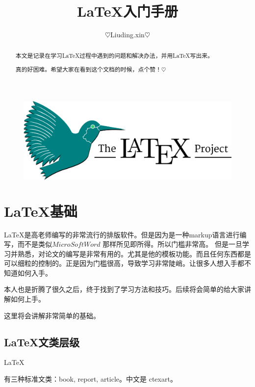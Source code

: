 \documentclass[UTF8]{ctexart}
\begin{document}
\title{\LaTeX 入门手册}
\author{$\heartsuit$Liuding.xin$\heartsuit$}


\begin{titlepage}
    \maketitle %
    \begin{figure}[htbp]
        \centering
        \includegraphics[scale=0.4,angle=-50]{images/1200px_LaTeX_project_logo_bird.svg.png}
    \end{figure}
\end{titlepage}

\tableofcontents

\listoffigures

\listoftables

\clearpage

\begin{abstract}
    本文是记录在学习\LaTeX 过程中遇到的问题和解决办法，并用\LaTeX 写出来。

    真的好困难。希望大家在看到这个文档的时候，点个赞！$\heartsuit$
\end{abstract}

\section{\LaTeX 基础}
\label{sec:knowledge}
\LaTeX 是高老师编写的非常流行的排版软件。但是因为是一种markup语言进行编写，而不是类似$MicroSoft Word$ 那样所见即所得。所以门槛非常高。
但是一旦学习并熟悉，对论文的编写是非常有用的。尤其是他的模板功能。而且任何东西都是可以细粒的控制的。正是因为门槛很高，导致学习非常陡峭。让很多人想入手都不知道如何入手。

本人也是折腾了很久之后，终于找到了学习方法和技巧。后续将会简单的给大家讲解如何上手。

这里将会讲解非常简单的基础。

\subsection{\LaTeX 文类层级}
\label{sec:structure}
\hypertarget{Levelofdepth}{\LaTeX} 有三种标准文类：book, report, article。中文是 ctexart。
\end{document}
